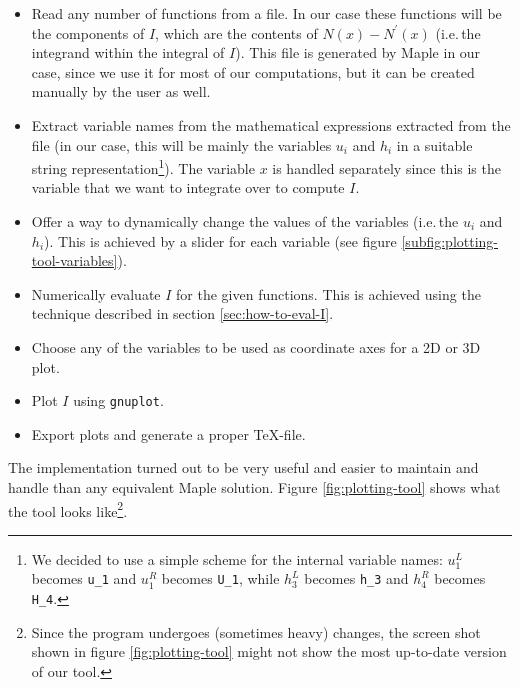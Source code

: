 \documentclass[a4paper, twoside]{article}
\begin{document}
\begin{itemize}
\item Read any number of functions from a file. In our case these functions will be the components of $I$, which are the contents of $N\left(x\right)-N^\prime\left(x\right)$ (i.e.\,the integrand within the integral of $I$). This file is generated by Maple in our case, since we use it for most of our computations, but it can be created manually by the user as well.
\item Extract variable names from the mathematical expressions extracted from the file (in our case, this will be mainly the variables $u_i$ and $h_i$ in a suitable string representation\footnote{We decided to use a simple scheme for the internal variable names: $u_1^L$ becomes \texttt{u\_1} and $u_1^R$ becomes \texttt{U\_1}, while $h_3^L$ becomes \texttt{h\_3} and $h_4^R$ becomes \texttt{H\_4}.}). The variable $x$ is handled separately since this is the variable that we want to integrate over to compute $I$.
\item Offer a way to dynamically change the values of the variables (i.e.\,the $u_i$ and $h_i$). This is achieved by a slider for each variable (see figure \ref{subfig:plotting-tool-variables}).
\item Numerically evaluate $I$ for the given functions. This is achieved using the technique described in section \ref{sec:how-to-eval-I}.
\item Choose any of the variables to be used as coordinate axes for a 2D or 3D plot.
\item Plot $I$ using \texttt{gnuplot}.
\item Export plots and generate a proper TeX-file.
\end{itemize}

The implementation turned out to be very useful and easier to maintain and handle than any equivalent Maple solution. Figure \ref{fig:plotting-tool} shows what the tool looks like\footnote{Since the program undergoes (sometimes heavy) changes, the screen shot shown in figure \ref{fig:plotting-tool} might not show the most up-to-date version of our tool.}.
\end{document}
